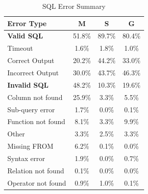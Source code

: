 \begin{table}
\caption{SQL Error Summary}
\label{tab:sql_error_summary}
\begin{tabular}{l|ccc}
\hline
\textbf{Error Type} & \textbf{M} & \textbf{S} & \textbf{G} \\
\hline
\textbf{Valid SQL} & 51.8\% & 89.7\% & 80.4\% \\
\quad Timeout & 1.6\% & 1.8\% & 1.0\% \\
\quad Correct Output & 20.2\% & 44.2\% & 33.0\% \\
\quad Incorrect Output & 30.0\% & 43.7\% & 46.3\% \\
\hline
\textbf{Invalid SQL} & 48.2\% & 10.3\% & 19.6\% \\
\quad Column not found & 25.9\% & 3.3\% & 5.5\% \\
\quad Sub-query error & 1.7\% & 0.0\% & 0.1\% \\
\quad Function not found & 8.1\% & 3.3\% & 9.9\% \\
\quad Other & 3.3\% & 2.5\% & 3.3\% \\
\quad Missing FROM & 6.2\% & 0.1\% & 0.0\% \\
\quad Syntax error & 1.9\% & 0.0\% & 0.7\% \\
\quad Relation not found & 0.1\% & 0.0\% & 0.0\% \\
\quad Operator not found & 0.9\% & 1.0\% & 0.1\% \\
\hline
\end{tabular}
\end{table}